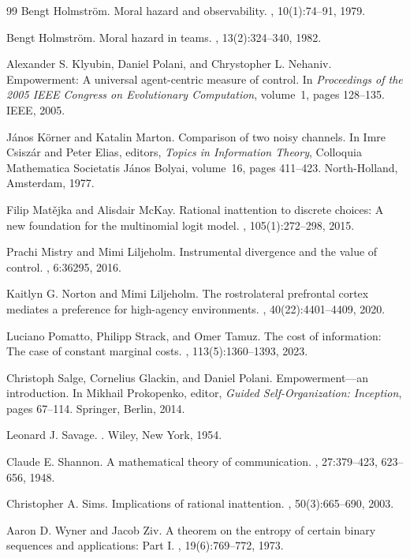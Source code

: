 \documentclass[11pt,a4paper]{article}
\theoremstyle{definition}
\newcommand{\1}{\mathbf 1}
\begin{document}
\begin{thebibliography}{99}
Bengt Holmstr\"om.
\newblock Moral hazard and observability.
, 10(1):74--91, 1979.

Bengt Holmstr\"om.
\newblock Moral hazard in teams.
, 13(2):324--340, 1982.


Alexander S. Klyubin, Daniel Polani, and Chrystopher L. Nehaniv.
\newblock Empowerment: A universal agent-centric measure of control.
\newblock In {\em Proceedings of the 2005 IEEE Congress on Evolutionary Computation}, volume~1, pages 128--135. IEEE,
  2005.

J\'anos K\"orner and Katalin Marton.
\newblock Comparison of two noisy channels.
\newblock In Imre Csisz\'ar and Peter Elias, editors, {\em Topics in Information Theory}, Colloquia Mathematica
  Societatis J\'anos Bolyai, volume~16, pages 411--423. North-Holland, Amsterdam, 1977.


Filip Mat\v{e}jka and Alisdair McKay.
\newblock Rational inattention to discrete choices: A new foundation for the multinomial logit model.
, 105(1):272--298, 2015.

Prachi Mistry and Mimi Liljeholm.
\newblock Instrumental divergence and the value of control.
, 6:36295, 2016.

Kaitlyn G. Norton and Mimi Liljeholm.
\newblock The rostrolateral prefrontal cortex mediates a preference for high-agency environments.
, 40(22):4401--4409, 2020.


Luciano Pomatto, Philipp Strack, and Omer Tamuz.
\newblock The cost of information: The case of constant marginal costs.
, 113(5):1360--1393, 2023.

Christoph Salge, Cornelius Glackin, and Daniel Polani.
\newblock Empowerment---an introduction.
\newblock In Mikhail Prokopenko, editor, {\em Guided Self-Organization: Inception}, pages 67--114. Springer, Berlin,
  2014.

Leonard J. Savage.
.
\newblock Wiley, New York, 1954.

Claude E. Shannon.
\newblock A mathematical theory of communication.
, 27:379--423, 623--656, 1948.

Christopher A. Sims.
\newblock Implications of rational inattention.
, 50(3):665--690, 2003.

Aaron D. Wyner and Jacob Ziv.
\newblock A theorem on the entropy of certain binary sequences and applications: Part {I}.
, 19(6):769--772, 1973.

\end{thebibliography}
\end{document}
